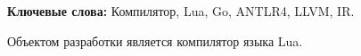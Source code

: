\begin{essay}{}

\par \textbf{Ключевые слова:} Компилятор, Lua, Go, ANTLR4, LLVM, IR.

\par Объектом разработки является компилятор языка Lua.



\end{essay}